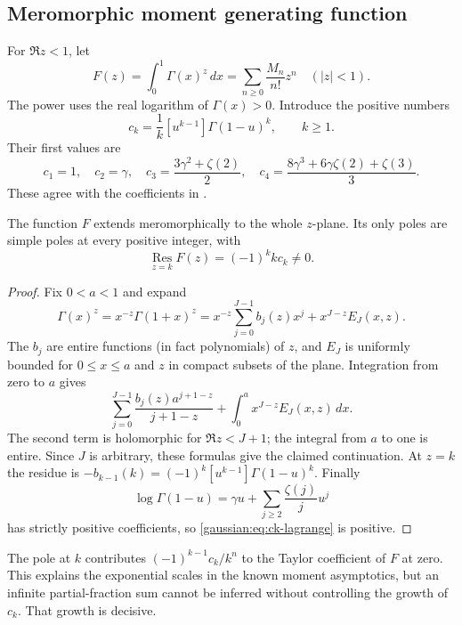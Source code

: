 

\subsection{Meromorphic moment generating function}
For $\Re z<1$, let
\[
 F(z)=\int_0^1\Gamma(x)^z\,dx
     =\sum_{n\ge0}\frac{M_n}{n!}z^n\quad (|z|<1).
\]
The power uses the real logarithm of $\Gamma(x)>0$.  Introduce the positive
numbers
\begin{equation}
 c_k=\frac1k[u^{k-1}]\Gamma(1-u)^k,\qquad k\ge1.
 \label{gaussian:eq:ck-lagrange}
\end{equation}
Their first values are
\[
 c_1=1,\quad c_2=\gamma,\quad
 c_3=\frac{3\gamma^2+\zeta(2)}2,\quad
 c_4=\frac{8\gamma^3+6\gamma\zeta(2)+\zeta(3)}3.
\]
These agree with the coefficients in \cite[Theorem~8.1]{gaussian:ACEMKM}.

\begin{proposition}
\label{gaussian:prop:moment-poles}
The function $F$ extends meromorphically to the whole $z$-plane.  Its only
poles are simple poles at every positive integer, with
\[
 \operatorname*{Res}_{z=k}F(z)=(-1)^k k c_k\ne0.
\]
\end{proposition}
\begin{proof}
Fix $0<a<1$ and expand
\[
 \Gamma(x)^z=x^{-z}\Gamma(1+x)^z
 =x^{-z}\sum_{j=0}^{J-1}b_j(z)x^j+x^{J-z}E_J(x,z).
\]
The $b_j$ are entire functions (in fact polynomials) of $z$, and $E_J$ is
uniformly bounded for $0\le x\le a$ and $z$ in compact subsets of the plane.
Integration from zero to $a$ gives
\[
 \sum_{j=0}^{J-1}\frac{b_j(z)a^{j+1-z}}{j+1-z}
 +\int_0^a x^{J-z}E_J(x,z)\,dx.
\]
The second term is holomorphic for $\Re z<J+1$; the integral from $a$ to
one is entire.  Since $J$ is arbitrary, these formulas give the claimed
continuation.  At $z=k$ the residue is
$-b_{k-1}(k)=(-1)^k[u^{k-1}]\Gamma(1-u)^k$.
Finally
\[
 \log\Gamma(1-u)=\gamma u+\sum_{j\ge2}\frac{\zeta(j)}j u^j
\]
has strictly positive coefficients, so \eqref{gaussian:eq:ck-lagrange} is positive.
\end{proof}

The pole at $k$ contributes $(-1)^{k-1}c_k/k^n$ to the Taylor coefficient
of $F$ at zero.  This explains the exponential scales in the known moment
asymptotics, but an infinite partial-fraction sum cannot be inferred
without controlling the growth of $c_k$.  That growth is decisive.

